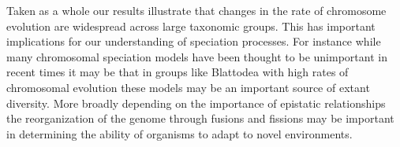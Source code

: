 Taken as a whole our results illustrate that changes in the rate of chromosome evolution are widespread across large taxonomic groups.
This has important implications for our understanding of speciation processes.
For instance while many chromosomal speciation models \citep{baker1986, white} have been thought to be unimportant in recent times it may be that in groups like Blattodea with high rates of chromosomal evolution these models may be an important source of extant diversity.
More broadly depending on the importance of epistatic relationships the reorganization of the genome through fusions and fissions may be important in determining the ability of organisms to adapt to novel environments.
